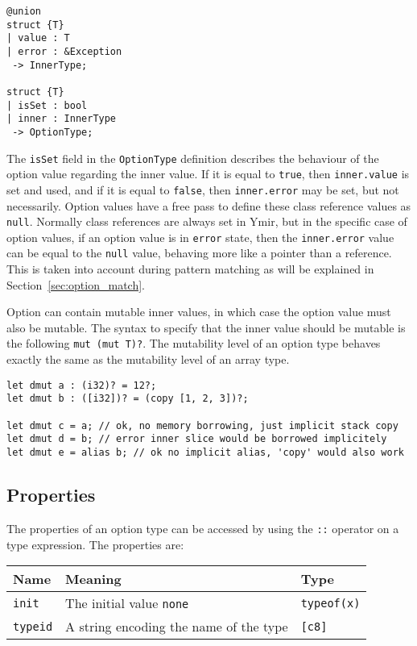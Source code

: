 \begin{lstlisting}[style=coloredverbatim]
@union
struct {T}
| value : T
| error : &Exception
 -> InnerType;

struct {T}
| isSet : bool
| inner : InnerType
 -> OptionType;
\end{lstlisting}

The \texttt{isSet} field in the \texttt{OptionType} definition describes the
behaviour of the option value regarding the inner value. If it is equal to
\texttt{true}, then \texttt{inner.value} is set and used, and if it is equal to
\texttt{false}, then \texttt{inner.error} may be set, but not necessarily.
Option values have a free pass to define these class reference values as
\texttt{null}. Normally class references are always set in Ymir, but in the
specific case of option values, if an option value is in \texttt{error} state,
then the \texttt{inner.error} value can be equal to the \texttt{null} value,
behaving more like a pointer than a reference. This is taken into account during
pattern matching as will be explained in Section~\ref{sec:option_match}.


Option can contain mutable inner values, in which case the option value must
also be mutable. The syntax to specify that the inner value should be mutable is
the following \texttt{mut (mut T)?}. The mutability level of an option type
behaves exactly the same as the mutability level of an array type.

\begin{lstlisting}[style=coloredverbatim]
let dmut a : (i32)? = 12?;
let dmut b : ([i32])? = (copy [1, 2, 3])?;

let dmut c = a; // ok, no memory borrowing, just implicit stack copy
let dmut d = b; // error inner slice would be borrowed implicitely
let dmut e = alias b; // ok no implicit alias, 'copy' would also work
\end{lstlisting}

\subsection{Properties}

The properties of an option type can be accessed by using the \texttt{::} operator on a type expression. The properties are:

\begin{center}\begin{adjustbox}{max width=\linewidth}
  \begin{tabular}{|l|ll|}
    \hline
    Name & Meaning & Type\\
    \hline
    \hline
    \texttt{init} & The initial value \texttt{none} & \texttt{typeof(x)}\\
    \hline
    \texttt{typeid} & A string encoding the name of the type & \texttt{[c8]} \\
    \hline
  \end{tabular}
\end{adjustbox}\end{center}

